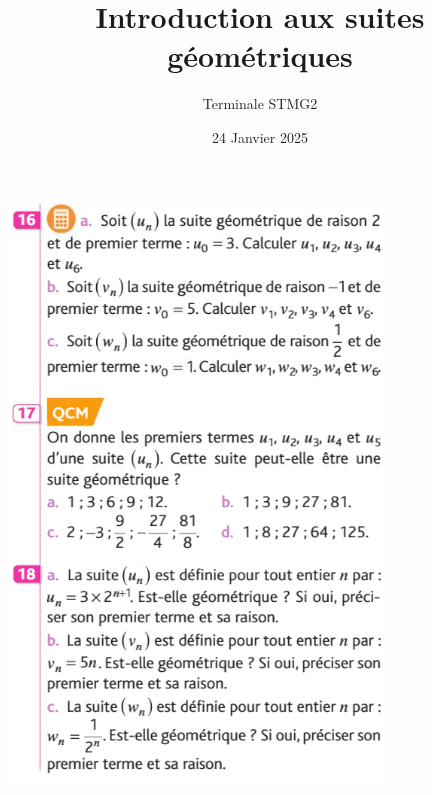 \documentclass{article}
\title{Introduction aux suites géométriques}
\author{Terminale STMG2}
\date{24 Janvier 2025}
\begin{document}
\maketitle

\begin{center}
\includegraphics[width=0.75\textwidth]{Exercices_suites_geometriques_1.png}
\end{center}
\end{document}
